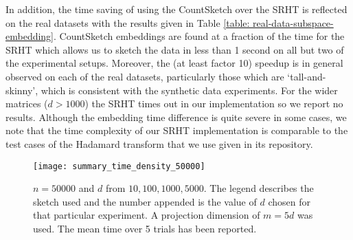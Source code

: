 In addition, the time saving of using the CountSketch over the SRHT is reflected
on the real datasets with the results given in Table
\ref{table: real-data-subspace-embedding}.
CountSketch embeddings are found at a fraction of the time for the SRHT which
allows us to sketch the data in less than 1 second on all but two of the
experimental setups.
Moreover, the (at least factor 10) speedup is in general observed on each of the
real datasets, particularly those which are `tall-and-skinny', which is consistent
with the synthetic data experiments.
For the wider matrices ($d>1000$) the SRHT times out in our
implementation so we report no results.
Although the embedding time difference is quite severe in some cases, we note
that the time complexity of our SRHT implementation is comparable to the test
cases of the Hadamard transform that we use given in its repository.


\begin{figure}
  \centering
\texttt{[image: summary\_time\_density\_50000]}
        \caption{$n=50000$ and $d$ from $10,100,1000,5000$.  The legend
        describes the sketch used and the number appended is the value of $d$
        chosen for that particular experiment.
        A projection dimension of $m=5d$ was used.
        The mean time over 5 trials has been reported.}
        \label{fig: summary-time-50000}
\end{figure}










